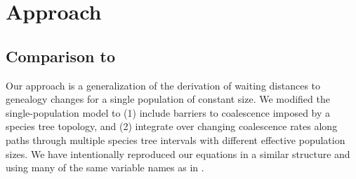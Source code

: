 \documentclass[11pt]{article}
\begin{document}







\section{Approach}
\subsection{Comparison to \citet{deng_distribution_2021}}

Our approach is a generalization of the \citet{deng_distribution_2021} derivation 
of waiting distances to genealogy changes for a single population of constant size. 
We modified the single-population model to (1) include barriers to coalescence imposed
by a species tree topology, and (2) integrate over changing coalescence rates along
paths through multiple species tree intervals with different effective population 
sizes. 
We have intentionally reproduced our equations in a similar structure and using
many of the same variable names as in \citet{deng_distribution_2021}.
\end{document}
